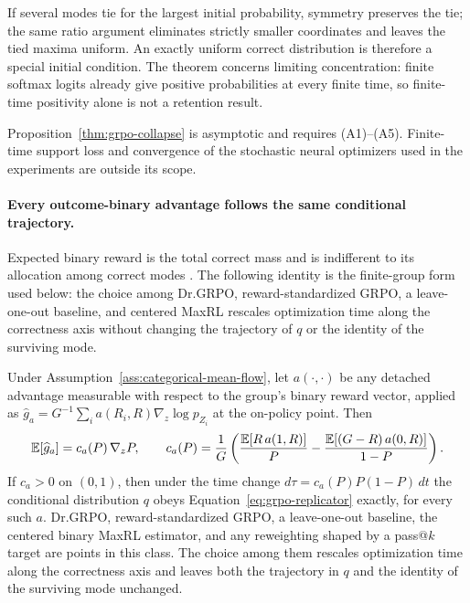 If several modes tie for the largest initial probability, symmetry preserves
the tie; the same ratio argument eliminates strictly smaller coordinates and
leaves the tied maxima uniform. An exactly uniform correct distribution is
therefore a special initial condition. The theorem concerns limiting
concentration: finite softmax logits already give positive probabilities at
every finite time, so finite-time positivity alone is not a retention result.

\begin{remark}
Proposition~\ref{thm:grpo-collapse} is asymptotic and requires (A1)--(A5).
Finite-time support loss and convergence of the stochastic neural optimizers
used in the experiments are outside its scope.
\end{remark}

\paragraph{Every outcome-binary advantage follows the same conditional trajectory.}
Expected binary reward is the total correct mass and is indifferent to its
allocation among correct modes \citep[Section~4.1]{lochab2026ucpo}. The
following identity is the finite-group form used below: the choice among
Dr.GRPO, reward-standardized GRPO, a leave-one-out baseline, and centered
MaxRL rescales optimization time along the correctness axis without changing
the trajectory of $q$ or the identity of the surviving mode.

\begin{lemma}
\label{thm:objective-inertness}
Under Assumption~\ref{ass:categorical-mean-flow}, let $a(\cdot,\cdot)$ be any
detached advantage measurable with respect to the group's binary reward
vector, applied as
$\widehat g_a=G^{-1}\sum_{i}a(R_i,R)\nabla_z\log p_{Z_i}$ at the on-policy
point. Then
\begin{equation}
  \mathbb E[\widehat g_a]=c_a(P)\,\nabla_zP,
  \qquad
  c_a(P)=\frac1G\left(
  \frac{\mathbb E[R\,a(1,R)]}{P}-\frac{\mathbb E[(G-R)\,a(0,R)]}{1-P}\right).
  \label{eq:objective-inertness}
\end{equation}
If $c_a>0$ on $(0,1)$, then under the time change
$d\tau=c_a(P)P(1-P)\,dt$ the conditional distribution $q$ obeys
Equation~\eqref{eq:grpo-replicator} exactly, for every such $a$. Dr.GRPO,
reward-standardized GRPO, a leave-one-out baseline, the centered binary MaxRL
estimator, and any reweighting shaped by a pass@$k$ target are points in this
class. The choice among them rescales optimization time along the correctness
axis and leaves both the trajectory in $q$ and the identity of the surviving
mode unchanged.
\end{lemma}

